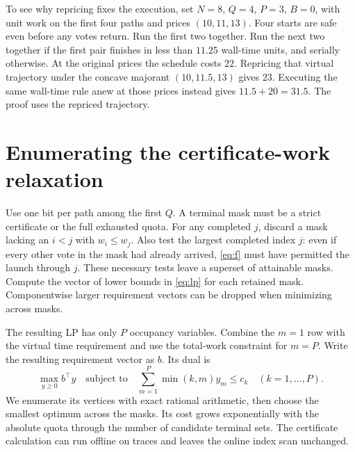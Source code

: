 To see why repricing fixes the execution, set $N=8$, $Q=4$, $P=3$, $B=0$, with unit work on the first four paths and prices $(10,11,13)$. Four starts are safe even before any votes return. Run the first two together. Run the next two together if the first pair finishes in less than $11.25$ wall-time units, and serially otherwise. At the original prices the schedule costs $22$. Repricing that virtual trajectory under the concave majorant $(10,11.5,13)$ gives $23$. Executing the same wall-time rule anew at those prices instead gives $11.5+20=31.5$. The proof uses the repriced trajectory.

\section{Enumerating the certificate-work relaxation}
Use one bit per path among the first \(Q\). A terminal mask must be a strict certificate or the full exhausted quota. For any completed \(j\), discard a mask lacking an \(i<j\) with \(w_i\le w_j\). Also test the largest completed index \(j\): even if every other vote in the mask had already arrived, \eqref{eq:f} must have permitted the launch through \(j\). These necessary tests leave a superset of attainable masks. Compute the vector of lower bounds in \eqref{eq:lp} for each retained mask. Componentwise larger requirement vectors can be dropped when minimizing across masks.

The resulting LP has only \(P\) occupancy variables. Combine the \(m=1\) row with the virtual time requirement and use the total-work constraint for \(m=P\). Write the resulting requirement vector as \(b\). Its dual is
\[
 \max_{y\ge0} b^\top y
 \quad\text{subject to}\quad
 \sum_{m=1}^P\min(k,m)y_m\le c_k\quad(k=1,\dots,P).
\]
We enumerate its vertices with exact rational arithmetic, then choose the smallest optimum across the masks. Its cost grows exponentially with the absolute quota through the number of candidate terminal sets. The certificate calculation can run offline on traces and leaves the online index scan unchanged.

